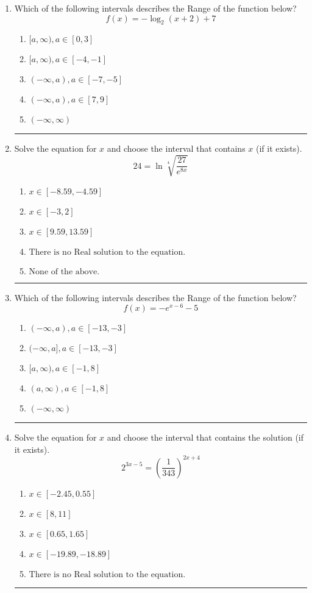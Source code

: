 \documentclass[14pt]{extbook}
\newcommand{\litem}[1]{\item#1\hspace*{-1cm}\rule{\textwidth}{0.4pt}}
\begin{document}
\begin{enumerate}
\litem{
Which of the following intervals describes the Range of the function below?\[ f(x) = -\log_2{(x+2)}+7 \]\begin{enumerate}[label=\Alph*.]
\item \( [a, \infty), a \in [0, 3] \)
\item \( [a, \infty), a \in [-4, -1] \)
\item \( (-\infty, a), a \in [-7, -5] \)
\item \( (-\infty, a), a \in [7, 9] \)
\item \( (-\infty, \infty) \)

\end{enumerate} }
\litem{
 Solve the equation for $x$ and choose the interval that contains $x$ (if it exists).\[  24 = \ln{\sqrt[4]{\frac{27}{e^{8x}}}} \]\begin{enumerate}[label=\Alph*.]
\item \( x \in [-8.59, -4.59] \)
\item \( x \in [-3, 2] \)
\item \( x \in [9.59, 13.59] \)
\item \( \text{There is no Real solution to the equation.} \)
\item \( \text{None of the above.} \)

\end{enumerate} }
\litem{
Which of the following intervals describes the Range of the function below?\[ f(x) = -e^{x-6}-5 \]\begin{enumerate}[label=\Alph*.]
\item \( (-\infty, a), a \in [-13, -3] \)
\item \( (-\infty, a], a \in [-13, -3] \)
\item \( [a, \infty), a \in [-1, 8] \)
\item \( (a, \infty), a \in [-1, 8] \)
\item \( (-\infty, \infty) \)

\end{enumerate} }
\litem{
Solve the equation for $x$ and choose the interval that contains the solution (if it exists).\[ 2^{3x-5} = \left(\frac{1}{343}\right)^{2x+4} \]\begin{enumerate}[label=\Alph*.]
\item \( x \in [-2.45, 0.55] \)
\item \( x \in [8, 11] \)
\item \( x \in [0.65, 1.65] \)
\item \( x \in [-19.89, -18.89] \)
\item \( \text{There is no Real solution to the equation.} \)


\end{enumerate}}
\end{enumerate}
\end{document}
